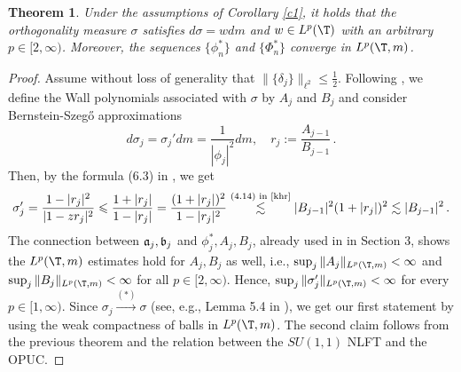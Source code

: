 \documentclass[twoside,a4paper]{amsart}
\def\le{\leqslant}
\newtheorem{theorem}{Theorem}[section]
\theoremstyle{remark}
\numberwithin{equation}{section}
\begin{document}
 \begin{theorem} Under the assumptions of  Corollary \ref{c1}, it holds that the orthogonality measure $\sigma$ satisfies $d\sigma=wdm$ and $w\in L^p(\T)$ with an arbitrary $p\in [2,\infty)$. Moreover, the sequences $\{\phi_n^*\}$ and $\{ \Phi_n^*\}$ converge in $L^p(\T,m)$.
 \end{theorem}
 
 
 
 
 
 \begin{proof}
 Assume without loss of generality that $\|\{\delta_j\}\|_{\ell^2}\le \frac 12$. Following \cite{khr}, we define the Wall polynomials associated with $\sigma$ by $A_j$ and $B_j$  and consider Bernstein-Szeg\H{o} approximations
 \[
 d\sigma_j=\sigma_j'dm=\frac{1}{|\phi_{j}|^2}dm, \quad r_j:=\frac{A_{j-1}}{B_{j-1}}\,.
 \]
 Then, by the formula (6.3) in \cite{khr}, we get
 \[
 \sigma_j'=\frac{1-|r_j|^2}{|1-zr_j|^2}\le \frac{1+|r_j|}{1-|r_j|}=\frac{(1+|r_j|)^2}{1-|r_j|^2}\stackrel{\text{(4.14) in \cite{khr}}}{\lesssim}|B_{j-1}|^2(1+|r_j|)^2\lesssim |B_{j-1}|^2\,.
 \]
 The connection between $\frak{a}_j,\frak{b}_j$ and $\phi_j^*,A_j,B_j$, already used in \cite{den26} in Section 3, shows the $L^p(\T,m)$ estimates hold for $A_j,B_j$ as well, i.e., $\sup_j\|A_j\|_{L^p(\T,m)}<\infty$ and $\sup_j\|B_j\|_{L^p(\T,m)}<\infty$ for all $p\in [2,\infty)$.
 Hence, $\sup_j\|\sigma_j'\|_{L^p(\T,m)}<\infty$ for every $p\in [1,\infty)$. Since $\sigma_j\stackrel{(*)}{\to}\sigma$ (see, e.g., Lemma 5.4 in \cite{khr}), we get our first statement by using the weak compactness of balls in $L^p(\T,m)$. The second claim follows from the previous theorem and the relation between the $SU(1,1)$ NLFT and the OPUC.
 \end{proof}
\bigskip\bigskip

 

\end{document}
